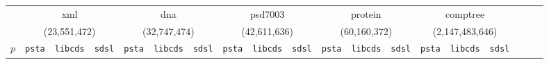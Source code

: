 \setcounter{pizzachili}{\value{footnote}}
\setcounter{xmldata}{\value{footnote}}
\setlength{\tabcolsep}{3pt}
\begin{table}[ht]
  \centering
  \begin{tabular}{crrrrrrrrrrrrrrrrrr}
    & \multicolumn{3}{c}{xml} & \multicolumn{3}{c}{dna} & \multicolumn{3}{c}{psd7003} & \multicolumn{3}{c}{protein} & \multicolumn{3}{c}{comptree}\\
    &  \multicolumn{3}{c}{(23,551,472)} & \multicolumn{3}{c}{(32,747,474)} & \multicolumn{3}{c}{(42,611,636)} & \multicolumn{3}{c}{(60,160,372)} & \multicolumn{3}{c}{(2,147,483,646)}\\
\hline
    $p$ & \verb|psta| & \verb|libcds| & \verb|sdsl|  & \verb|psta| & \verb|libcds| & \verb|sdsl| & \verb|psta| & \verb|libcds| & \verb|sdsl| & \verb|psta| & \verb|libcds| & \verb|sdsl| & \verb|psta| & \verb|libcds| & \verb|sdsl|\\


\end{tabular}
\end{table}

